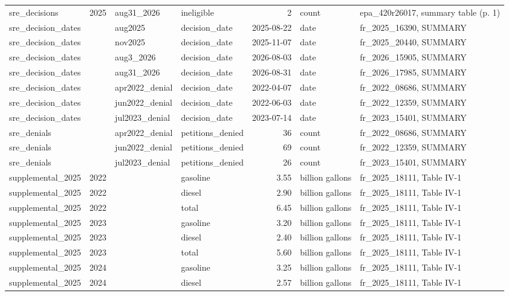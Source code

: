 \begin{longtable}{p{2.3cm}p{0.7cm}p{1.0cm}p{2.6cm}rp{1.7cm}p{4.6cm}}
sre\_decisions & 2025 & aug31\_2026 & ineligible & 2 & count & epa\_420r26017, summary table (p. 1) \\
sre\_decision\_dates &  & aug2025 & decision\_date & 2025-08-22 & date & fr\_2025\_16390, SUMMARY \\
sre\_decision\_dates &  & nov2025 & decision\_date & 2025-11-07 & date & fr\_2025\_20440, SUMMARY \\
sre\_decision\_dates &  & aug3\_2026 & decision\_date & 2026-08-03 & date & fr\_2026\_15905, SUMMARY \\
sre\_decision\_dates &  & aug31\_2026 & decision\_date & 2026-08-31 & date & fr\_2026\_17985, SUMMARY \\
sre\_decision\_dates &  & apr2022\_denial & decision\_date & 2022-04-07 & date & fr\_2022\_08686, SUMMARY \\
sre\_decision\_dates &  & jun2022\_denial & decision\_date & 2022-06-03 & date & fr\_2022\_12359, SUMMARY \\
sre\_decision\_dates &  & jul2023\_denial & decision\_date & 2023-07-14 & date & fr\_2023\_15401, SUMMARY \\
sre\_denials &  & apr2022\_denial & petitions\_denied & 36 & count & fr\_2022\_08686, SUMMARY \\
sre\_denials &  & jun2022\_denial & petitions\_denied & 69 & count & fr\_2022\_12359, SUMMARY \\
sre\_denials &  & jul2023\_denial & petitions\_denied & 26 & count & fr\_2023\_15401, SUMMARY \\
supplemental\_2025 & 2022 &  & gasoline & 3.55 & billion gallons & fr\_2025\_18111, Table IV-1 \\
supplemental\_2025 & 2022 &  & diesel & 2.90 & billion gallons & fr\_2025\_18111, Table IV-1 \\
supplemental\_2025 & 2022 &  & total & 6.45 & billion gallons & fr\_2025\_18111, Table IV-1 \\
supplemental\_2025 & 2023 &  & gasoline & 3.20 & billion gallons & fr\_2025\_18111, Table IV-1 \\
supplemental\_2025 & 2023 &  & diesel & 2.40 & billion gallons & fr\_2025\_18111, Table IV-1 \\
supplemental\_2025 & 2023 &  & total & 5.60 & billion gallons & fr\_2025\_18111, Table IV-1 \\
supplemental\_2025 & 2024 &  & gasoline & 3.25 & billion gallons & fr\_2025\_18111, Table IV-1 \\
supplemental\_2025 & 2024 &  & diesel & 2.57 & billion gallons & fr\_2025\_18111, Table IV-1 \\

\end{longtable}
